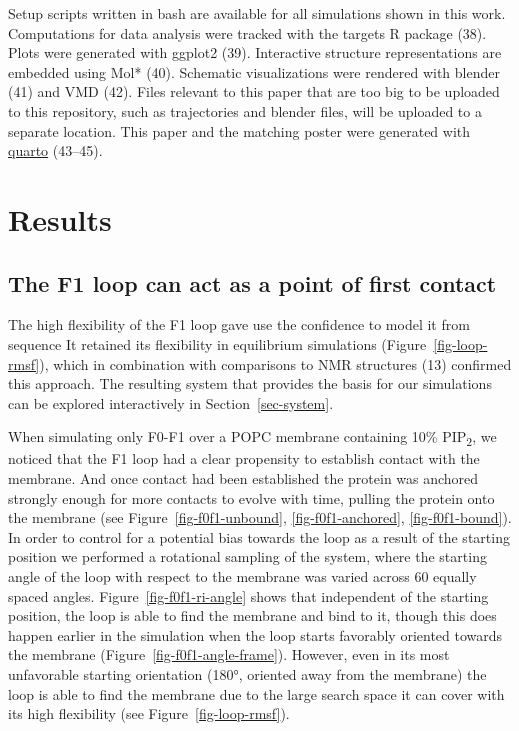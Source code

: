 \documentclass[
  letterpaper,
  DIV=11,
  numbers=noendperiod]{scrartcl}
\begin{document}
Setup scripts written in bash are available for all simulations shown in
this work. Computations for data analysis were tracked with the targets
R package (38). Plots were generated with ggplot2 (39). Interactive
structure representations are embedded using Mol* (40). Schematic
visualizations were rendered with blender (41) and VMD (42). Files
relevant to this paper that are too big to be uploaded to this
repository, such as trajectories and blender files, will be uploaded to
a separate location. This paper and the matching poster were generated
with \href{https://quarto.org/}{quarto} (43--45).

\hypertarget{results}{%
\section{Results}\label{results}}

\hypertarget{the-f1-loop-can-act-as-a-point-of-first-contact}{%
\subsection{The F1 loop can act as a point of first
contact}\label{the-f1-loop-can-act-as-a-point-of-first-contact}}

The high flexibility of the F1 loop gave use the confidence to model it
from sequence It retained its flexibility in equilibrium simulations
(Figure~\ref{fig-loop-rmsf}), which in combination with comparisons to
NMR structures (13) confirmed this approach. The resulting system that
provides the basis for our simulations can be explored interactively in
Section~\ref{sec-system}.

When simulating only F0-F1 over a POPC membrane containing 10\%
PIP\textsubscript{2}, we noticed that the F1 loop had a clear propensity
to establish contact with the membrane. And once contact had been
established the protein was anchored strongly enough for more contacts
to evolve with time, pulling the protein onto the membrane (see
Figure~\ref{fig-f0f1-unbound}, \ref{fig-f0f1-anchored}, \ref{fig-f0f1-bound}).
In order to control for a potential bias towards the loop as a result of
the starting position we performed a rotational sampling of the system,
where the starting angle of the loop with respect to the membrane was
varied across 60 equally spaced angles. Figure~\ref{fig-f0f1-ri-angle}
shows that independent of the starting position, the loop is able to
find the membrane and bind to it, though this does happen earlier in the
simulation when the loop starts favorably oriented towards the membrane
(Figure~\ref{fig-f0f1-angle-frame}). However, even in its most
unfavorable starting orientation (180°, oriented away from the membrane)
the loop is able to find the membrane due to the large search space it
can cover with its high flexibility (see Figure~\ref{fig-loop-rmsf}).
\end{document}
